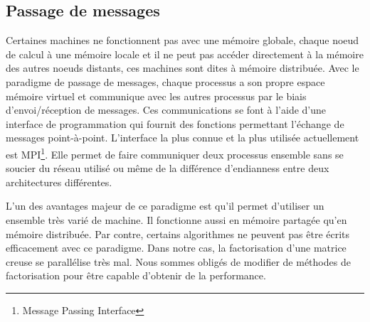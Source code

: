 \subsection{Passage de messages}
Certaines machines ne fonctionnent pas avec une mémoire globale, chaque noeud de calcul à une mémoire locale et il ne peut pas accéder directement à la mémoire des autres noeuds distants, ces machines sont dites à mémoire distribuée.
%
Avec le paradigme de passage de messages, chaque processus a son propre espace mémoire virtuel et communique avec les autres processus par le biais d'envoi/réception de messages.
%
Ces communications se font à l'aide d'une interface de programmation qui fournit des fonctions permettant l'échange de messages point-à-point.
%
L'interface la plus connue et la plus utilisée actuellement est MPI\footnote{Message Passing Interface}.
%
Elle permet de faire communiquer deux processus ensemble sans se soucier du réseau utilisé ou même de la différence d'endianness entre deux architectures différentes.


L'un des avantages majeur de ce paradigme est qu'il permet d'utiliser un ensemble très varié de machine.
%
Il fonctionne aussi en mémoire partagée qu'en mémoire distribuée.
%
Par contre, certains algorithmes ne peuvent pas être écrits efficacement avec ce paradigme.
%
Dans notre cas, la factorisation d'une matrice creuse se parallélise très mal.
%
Nous sommes obligés de modifier de méthodes de factorisation pour être capable d'obtenir de la performance.

